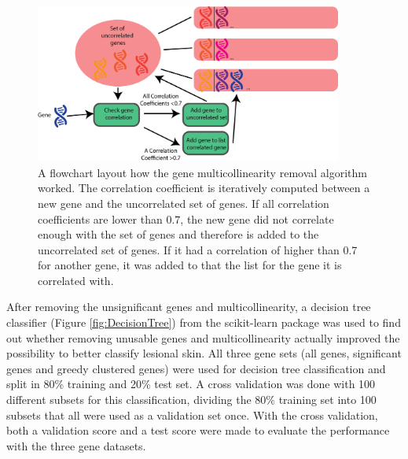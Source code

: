 \documentclass[10pt,a4paper]{report}
\begin{document}
	\begin{figure}[H]
		\includegraphics[width=0.9\textwidth]{GreedyClustering.png}
		\caption{A flowchart layout how the gene multicollinearity removal algorithm worked. The correlation coefficient is iteratively computed between a new gene and the uncorrelated set of genes. If all correlation coefficients are lower than $0.7$, the new gene did not correlate enough with the set of genes and therefore is added to the uncorrelated set of genes. If it had a correlation of higher than 0.7 for another gene, it was added to that the list for the gene it is correlated with.}
		\label{fig:GreedyCorrelationClustering}
	\end{figure}
	
	After removing the unsignificant genes and multicollinearity, a decision tree classifier (Figure \ref{fig:DecisionTree}) from the scikit-learn package was used to find out whether removing unusable genes and multicollinearity actually improved the possibility to better classify lesional skin. All three gene sets (all genes, significant genes and greedy clustered genes) were used for decision tree classification and split in 80\% training and 20\% test set. A cross validation was done with 100 different subsets for this classification, dividing the 80\% training set into 100 subsets that all were used as a validation set once. With the cross validation, both a validation score and a test score were made to evaluate the performance with the three gene datasets.
	
\end{document}
